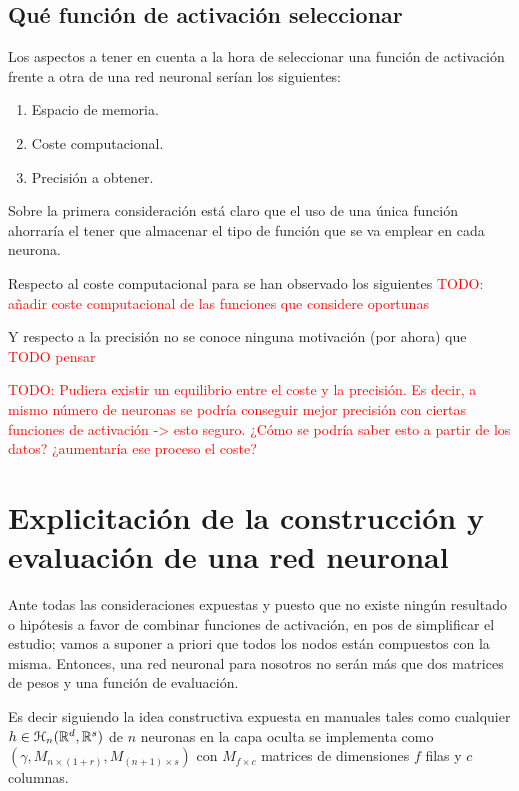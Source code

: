 \subsection{Qué función de activación seleccionar}

Los aspectos a tener en cuenta a la hora de seleccionar una función 
de activación frente a otra de una red neuronal serían los siguientes:
\begin{enumerate}
    \item Espacio de memoria.
    \item Coste computacional.
    \item Precisión a obtener.
\end{enumerate}

Sobre la primera consideración está claro que el uso de una única función ahorraría el tener que almacenar el tipo de función que se va emplear en cada neurona.

Respecto al coste computacional para se han observado los siguientes
\textcolor{red}{TODO:  añadir coste computacional  de las funciones que considere oportunas}

Y respecto a la precisión no se conoce ninguna motivación (por ahora)
que \textcolor{red}{TODO pensar}

\textcolor{red}{TODO: Pudiera existir un equilibrio entre 
el coste y la precisión. Es decir, a mismo número de neuronas se podría conseguir mejor precisión con ciertas funciones de activación -> esto seguro. ¿Cómo se podría saber esto a partir de los datos? ¿aumentaría ese proceso el coste?}



\section{Explicitación de la construcción y evaluación de una red neuronal}

Ante todas las consideraciones expuestas y puesto que 
no existe ningún resultado o hipótesis a favor de combinar funciones de activación, en pos de simplificar el estudio; vamos a suponer a priori que todos los nodos están compuestos con la misma. Entonces,  una red neuronal para nosotros 
no serán más que dos matrices de pesos y una función de evaluación. 

Es decir siguiendo la idea constructiva expuesta en manuales tales como \cite{learning-from-data-1-2}
 cualquier $h \in \mathcal{H}_n(\mathbb{R}^d,\mathbb{R}^s)$ de $n$ neuronas en la capa oculta se implementa como 
$(\gamma, M_{n \times (1+r)}, M_{(n+1) \times s})$ con $M_{f \times c}$ matrices de dimensiones $f$ filas y $c$ columnas. 


